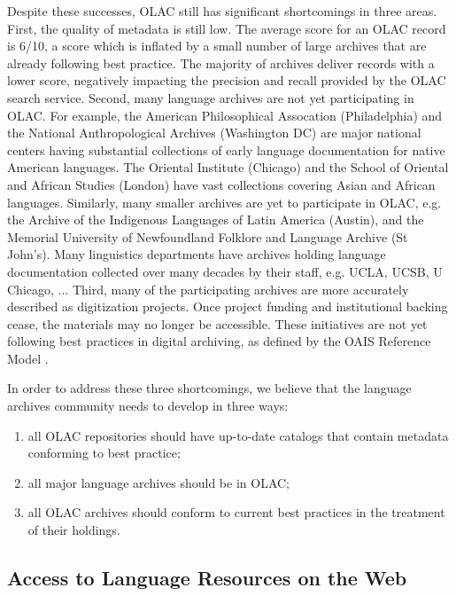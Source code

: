 Despite these successes, OLAC still has significant shortcomings in
three areas.
First, the quality of metadata is still low.  The average score for an
OLAC record is 6/10, a score which is inflated by a small number of
large archives that are already following best practice.  The majority
of archives deliver records with a lower score, negatively impacting
the precision and recall provided by the OLAC search service.
Second, many language archives are not yet participating in OLAC.  For
example, the American Philosophical Assocation (Philadelphia) and the
National Anthropological Archives (Washington DC) are major national
centers having substantial collections of early language documentation
for native American languages.  The Oriental Institute (Chicago) and
the School of Oriental and African Studies (London) have vast
collections covering Asian and African languages.  Similarly, many
smaller archives are yet to participate in OLAC, e.g. the
Archive of the Indigenous Languages of Latin America (Austin), and the
Memorial University of Newfoundland Folklore and Language Archive (St
John's).  Many linguistics departments have archives holding language
documentation collected over many decades by their staff, e.g. UCLA,
UCSB, U Chicago, ...
Third, many of the participating archives are more accurately described
as digitization projects.  Once project funding and institutional
backing cease, the materials may no longer be accessible.  These
initiatives are not yet following best practices in digital archiving,
as defined by the OAIS Reference Model \citep{OAIS02}.


In order to address these three shortcomings, we believe that the
language archives community needs to develop in three ways:

\begin{enumerate}
\item all OLAC repositories should have up-to-date catalogs
      that contain metadata conforming to best practice;
\item all major language archives should be in OLAC;
\item all OLAC archives should conform to current best practices
      in the treatment of their holdings.
\end{enumerate}

\subsection{Access to Language Resources on the Web}

